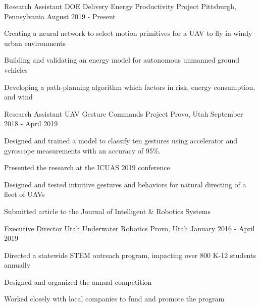

\begin{cventries}

  \cventry
    {Research Assistant} %
    {DOE Delivery Energy Productivity Project} %
    {Pittsburgh, Pennsylvania} %
    {August 2019 - Present} %
    {
      \begin{cvitems}
      \item Creating a neural network to select motion primitives for a UAV to fly in windy urban environments
      \item Building and validating an energy model for autonomous unmanned ground vehicles
      \item Developing a path-planning algorithm which factors in risk, energy consumption, and wind
      \end{cvitems}
    }

  \cventry
    {Research Assistant} %
    {UAV Gesture Commands Project} %
    {Provo, Utah} %
    {September 2018 - April 2019} %
    {
      \begin{cvitems}
        \item Designed and trained a model to classify ten gestures using accelerator and gyroscope measurements with an accuracy of 95\%. 
        \item Presented the research at the ICUAS 2019 conference
        \item Designed and tested intuitive gestures and behaviors for natural directing of a fleet of UAVs
        \item Submitted article to the Journal of Intelligent \& Robotics Systems
      \end{cvitems}
    }

  \cventry
    {Executive Director}
    {Utah Underwater Robotics}
    {Provo, Utah}
    {January 2016 - April 2019}
    {
      \begin{cvitems}
        \item Directed a statewide STEM outreach program, impacting over 800 K-12 students annually
        \item Designed and organized the annual competition 
        \item  Worked closely with local companies to fund and promote the program
      \end{cvitems}
    }


\end{cventries}
